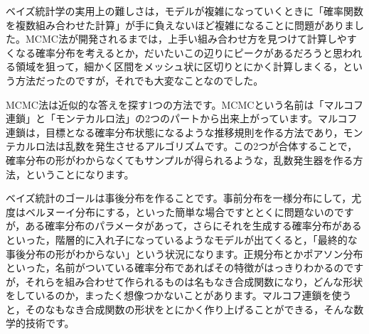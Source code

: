 \documentclass{ltjsarticle}
\begin{document}
ベイズ統計学の実用上の難しさは，モデルが複雑になっていくときに「確率関数を複数組み合わせた計算」が手に負えないほど複雑になることに問題がありました。MCMC法が開発されるまでは，上手い組み合わせ方を見つけて計算しやすくなる確率分布を考えるとか，だいたいこの辺りにピークがあるだろうと思われる領域を狙って，細かく区間をメッシュ状に区切りとにかく計算しまくる，という方法だったのですが，それでも大変なことなのでした。

MCMC法は近似的な答えを探す1つの方法です。MCMCという名前は「マルコフ連鎖」と「モンテカルロ法」の2つのパートから出来上がっています。マルコフ連鎖は，目標となる確率分布状態になるような推移規則を作る方法であり，モンテカルロ法は乱数を発生させるアルゴリズムです。この2つが合体することで，確率分布の形がわからなくてもサンプルが得られるような，乱数発生器を作る方法，ということになります。

ベイズ統計のゴールは事後分布を作ることです。事前分布を一様分布にして，尤度はベルヌーイ分布にする，といった簡単な場合ですととくに問題ないのですが，ある確率分布のパラメータがあって，さらにそれを生成する確率分布があるといった，階層的に入れ子になっているようなモデルが出てくると，「最終的な事後分布の形がわからない」という状況になります。正規分布とかポアソン分布といった，名前がついている確率分布であればその特徴がはっきりわかるのですが，それらを組み合わせて作られるものは名もなき合成関数になり，どんな形状をしているのか，まったく想像つかないことがあります。マルコフ連鎖を使うと，そのなもなき合成関数の形状をとにかく作り上げることができる，そんな数学的技術です。
\end{document}

